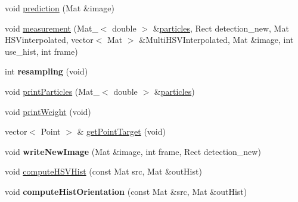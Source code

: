 \begin{DoxyCompactItemize}
\item 
void \hyperlink{classParticleFilter_a8ceef9972d364c1b53803403440ef439}{prediction} (Mat \&image)
\item 
void \hyperlink{classParticleFilter_a81cbc751eb7bd585b0acfa380930c8de}{measurement} (Mat\-\_\-$<$ double $>$ \&\hyperlink{classParticleFilter_ae9823740efabda90ff9c24b7b8f91dc5}{particles}, Rect detection\-\_\-new, Mat H\-S\-Vinterpolated, vector$<$ Mat $>$ \&Multi\-H\-S\-V\-Interpolated, Mat \&image, int use\-\_\-hist, int frame)
\item 
\hypertarget{classParticleFilter_a857e2f601eee0861e4e34522433c5e7c}{int {\bfseries resampling} (void)}\label{classParticleFilter_a857e2f601eee0861e4e34522433c5e7c}

\item 
void \hyperlink{classParticleFilter_a6bdd0c3e0160e1b89d4cbfd736eaffd0}{print\-Particles} (Mat\-\_\-$<$ double $>$ \&\hyperlink{classParticleFilter_ae9823740efabda90ff9c24b7b8f91dc5}{particles})
\item 
void \hyperlink{classParticleFilter_a65e44b839c45cdace2aa1bc630097cf8}{print\-Weight} (void)
\item 
vector$<$ Point $>$ \& \hyperlink{classParticleFilter_acf5397c9e4a72db53fbea7bbe058cf4e}{get\-Point\-Target} (void)
\item 
\hypertarget{classParticleFilter_a57770403a97f09e9a676869da371c6ed}{void {\bfseries write\-New\-Image} (Mat \&image, int frame, Rect detection\-\_\-new)}\label{classParticleFilter_a57770403a97f09e9a676869da371c6ed}

\item 
void \hyperlink{classParticleFilter_adb05ace32154b17c2bb042ea97490ec7}{compute\-H\-S\-V\-Hist} (const Mat src, Mat \&out\-Hist)
\item 
\hypertarget{classParticleFilter_a41b340ab6879d08bffd5de90bce8983e}{void {\bfseries compute\-Hist\-Orientation} (const Mat \&src, Mat \&out\-Hist)}\label{classParticleFilter_a41b340ab6879d08bffd5de90bce8983e}


\end{DoxyCompactItemize}
